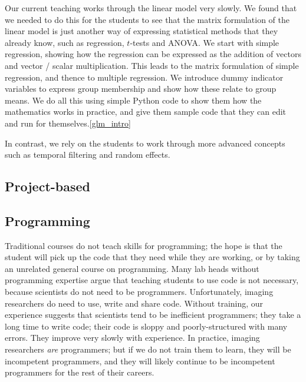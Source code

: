 Our current teaching works through the linear model very slowly. We found that
we needed to do this for the students to see that the matrix formulation of
the linear model is just another way of expressing statistical methods that
they already know, such as regression, $t$-tests and ANOVA.  We start with
simple regression, showing how the regression can be expressed as the addition
of vectors and vector / scalar multiplication.  This leads to the matrix
formulation of simple regression, and thence to multiple regression.  We
introduce dummy indicator variables to express group membership and show how
these relate to group means.  We do all this using simple Python code to show
them how the mathematics works in practice, and give them sample code that
they can edit and run for themselves.\cref{glm_intro}

In contrast, we rely on the students to work through more advanced concepts
such as temporal filtering and random effects.

\subsection{Project-based}


\subsection{Programming}

Traditional courses do not teach skills for programming; the hope is that the
student will pick up the code that they need while they are working, or by
taking an unrelated general course on programming.  Many lab heads without
programming expertise argue that teaching students to use code is not
necessary, because scientists do not need to be programmers.  Unfortunately,
imaging researchers do need to use, write and share code.  Without training,
our experience suggests that scientists tend to be inefficient programmers;
they take a long time to write code; their code is sloppy and
poorly-structured with many errors.  They improve very slowly with experience.
In practice, imaging researchers {\em are} programmers; but if we do not train
them to learn, they will be incompetent programmers, and they will likely
continue to be incompetent programmers for the rest of their careers.

